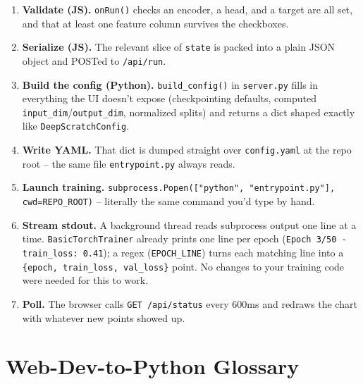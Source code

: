 \documentclass[11pt]{article}
\begin{document}
\begin{enumerate}
  \item \textbf{Validate (JS).} \lstinline{onRun()} checks an encoder, a
  head, and a target are all set, and that at least one feature column
  survives the checkboxes.
  \item \textbf{Serialize (JS).} The relevant slice of \lstinline{state} is
  packed into a plain JSON object and POSTed to \lstinline{/api/run}.
  \item \textbf{Build the config (Python).} \lstinline{build_config()} in
  \lstinline{server.py} fills in everything the UI doesn't expose
  (checkpointing defaults, computed \lstinline{input_dim}/\lstinline{output_dim},
  normalized splits) and returns a dict shaped exactly like
  \lstinline{DeepScratchConfig}.
  \item \textbf{Write YAML.} That dict is dumped straight over
  \lstinline{config.yaml} at the repo root -- the same file
  \lstinline{entrypoint.py} always reads.
  \item \textbf{Launch training.}
  \lstinline{subprocess.Popen(["python", "entrypoint.py"], cwd=REPO_ROOT)} --
  literally the same command you'd type by hand.
  \item \textbf{Stream stdout.} A background thread reads subprocess output
  one line at a time. \lstinline{BasicTorchTrainer} already prints one line
  per epoch (\lstinline{Epoch 3/50 - train_loss: 0.41}); a
  regex (\lstinline{EPOCH_LINE}) turns each matching line into a
  \lstinline|{epoch, train_loss, val_loss}| point. No changes to your
  training code were needed for this to work.
  \item \textbf{Poll.} The browser calls \lstinline{GET /api/status} every
  600ms and redraws the chart with whatever new points showed up.
\end{enumerate}

\section{Web-Dev-to-Python Glossary}
\end{document}
